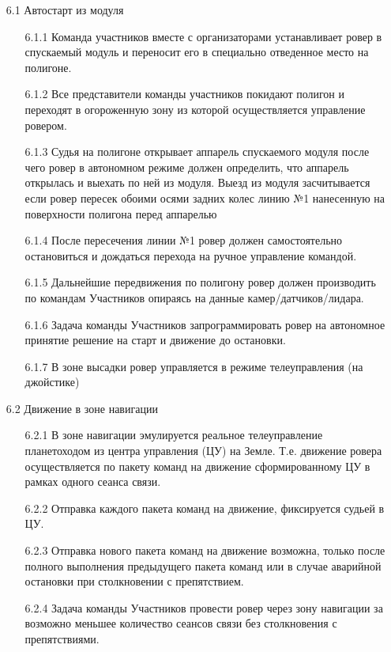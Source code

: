 \begin{enumerate}
    \item[6.1] Автостарт из модуля
    \begin{enumerate}
        \item[6.1.1] Команда участников вместе с организаторами устанавливает ровер в спускаемый модуль и переносит его в специально отведенное место на полигоне.   
        \item[6.1.2] Все представители команды участников покидают полигон и переходят в огороженную зону из которой осуществляется управление  ровером.
        \item[6.1.3] Судья на полигоне открывает аппарель спускаемого модуля после чего ровер в автономном режиме должен определить, что аппарель открылась и выехать по ней из модуля. Выезд из модуля засчитывается если ровер пересек обоими осями задних колес линию №1 нанесенную на поверхности полигона перед аппарелью
        \item[6.1.4] После пересечения линии №1 ровер должен самостоятельно остановиться и дождаться перехода на ручное управление командой.
        \item[6.1.5] Дальнейшие передвижения по полигону ровер должен производить по командам Участников опираясь на данные камер/датчиков/лидара.
        \item[6.1.6] Задача команды Участников запрограммировать ровер на автономное принятие решение на старт и движение до остановки. 
        \item[6.1.7] В зоне высадки ровер управляется в режиме телеуправления (на джойстике)
    \end{enumerate}
    \item[6.2] Движение в зоне навигации
    \begin{enumerate} 
	    \item[6.2.1] В зоне навигации эмулируется реальное телеуправление планетоходом из центра управления (ЦУ) на Земле. Т.е. движение ровера осуществляется по пакету команд на движение сформированному ЦУ в рамках одного сеанса связи.
	    \item[6.2.2]  Отправка каждого пакета команд на движение, фиксируется судьей в ЦУ.
        \item[6.2.3] Отправка нового пакета команд на движение возможна, только после полного выполнения предыдущего пакета команд или в случае аварийной остановки при столкновении с препятствием. 
        \item[6.2.4] Задача команды Участников провести ровер через зону навигации за возможно меньшее количество сеансов связи без столкновения с препятствиями.

\end{enumerate}
\end{enumerate}
